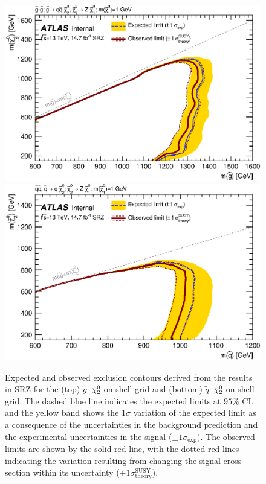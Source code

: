\begin{figure}[!htb]
\centering
\includegraphics[width=.8\textwidth]{figures/interpretation/excl_SM_GG_N2_1.eps}
\includegraphics[width=.8\textwidth]{figures/interpretation/excl_SM_SS_N2.eps}  
\caption{
Expected and observed exclusion contours derived from the results in SRZ for the (top) $\tilde{g}$--$\tilde{\chi}_2^0$ on-shell grid and (bottom) $\tilde{q}$--$\tilde{\chi}_2^0$ on-shell grid. 
The dashed blue line indicates the expected limits at $95\%$ CL and the yellow band shows the $1\sigma$ variation of the expected limit as a consequence of the uncertainties in the background prediction and the experimental uncertainties in the signal ($\pm1\sigma_\text{exp}$). 
The observed limits are shown by the solid red line, with the dotted red lines indicating the variation resulting from changing the signal cross section within its uncertainty ($\pm1\sigma^\text{SUSY}_\text{theory}$). \label{fig:excl_SMGGN2_1}
}
\end{figure}

